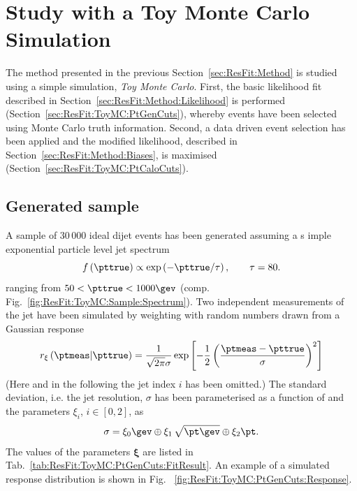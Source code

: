 

\section{Study with a Toy Monte Carlo Simulation}\label{sec:ResFit:ToyMC}

The method presented in the previous Section~\ref{sec:ResFit:Method}
is studied using a simple simulation, \textit{Toy Monte Carlo}.
First, the basic likelihood fit described in
Section~\ref{sec:ResFit:Method:Likelihood} is performed (Section~\ref{sec:ResFit:ToyMC:PtGenCuts}),
whereby events have been selected using Monte Carlo truth information.
Second, a data driven event selection has been applied and the
modified likelihood, described in
Section~\ref{sec:ResFit:Method:Biases}, is maximised (Section~\ref{sec:ResFit:ToyMC:PtCaloCuts}).


\subsection{Generated sample}\label{sec:ResFit:ToyMC:Sample}

A sample of $30\,000$ ideal dijet events has been generated assuming a
s imple exponential particle level jet \pt spectrum
\begin{equation}
  \label{eq:ResFit:ToyMC:Spectrum}
  f\left(\pttrue\right) \propto \exp\left(-\pttrue / \tau\right),
  \qquad \tau = 80.
\end{equation}
ranging from \mbox{$50 < \pttrue < 1000\gev$} (comp. Fig.~\ref{fig:ResFit:ToyMC:Sample:Spectrum}).
Two independent measurements of the jet \pt have been simulated by
weighting \pttrue with random numbers drawn from a Gaussian response
\begin{equation}
  \label{eq:ResFit:ToyMC:Response}
  r_{\mathbf{\xi}}\left(\ptmeas|\pttrue\right) = 
  \frac{1}{\sqrt{2\pi}\sigma}\exp\left[-\frac{1}{2}\left(\frac{\ptmeas - \pttrue}{\sigma}\right)^{2}\right]
\end{equation}
(Here and in the following the jet index $i$ has been omitted.)
The standard deviation, i.e. the jet resolution, $\sigma$ has been parameterised as a function of \pttrue and
the parameters $\xi_{i}$, \mbox{$i\in [0,2]$}, as
\begin{equation}
  \label{eq:ResFit:ToyMC:Sigma}
  \sigma = \xi_{0}\gev
  \oplus \xi_{1}\,\sqrt{\pt\gev}\oplus \xi_{2}\pt.
\end{equation}
The values of the parameters $\mathbf{\xi}$ are listed in
Tab.~\ref{tab:ResFit:ToyMC:PtGenCuts:FitResult}.
An example of a simulated response distribution is shown in Fig. ~\ref{fig:ResFit:ToyMC:PtGenCuts:Response}.

